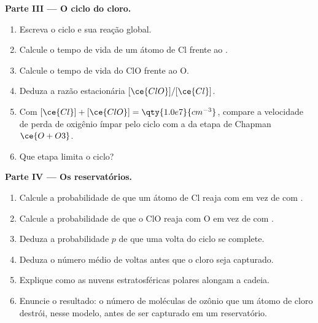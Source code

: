 \begin{problem}
\medskip\noindent\textbf{Parte III --- O ciclo do cloro.}
\begin{enumerate}[resume]
  \item Escreva o ciclo e sua reação global.
  \item Calcule o tempo de vida de um átomo de Cl frente ao .
  \item Calcule o tempo de vida do ClO frente ao O.
  \item Deduza a razão estacionária $[\ce{ClO}]/[\ce{Cl}]$.
  \item Com $[\ce{Cl}] + [\ce{ClO}] = \qty{1.0e7}{cm^{-3}}$, compare a velocidade de perda de oxigênio
        ímpar pelo ciclo com a da etapa de Chapman $\ce{O + O3}$.
  \item Que etapa limita o ciclo?
\end{enumerate}

\medskip\noindent\textbf{Parte IV --- Os reservatórios.}
\begin{enumerate}[resume]
  \item Calcule a probabilidade de que um átomo de Cl reaja com  em vez de com
        .
  \item Calcule a probabilidade de que o ClO reaja com O em vez de com .
  \item Deduza a probabilidade $p$ de que uma volta do ciclo se complete.
  \item Deduza o número médio de voltas antes que o cloro seja capturado.
  \item Explique como as nuvens estratosféricas polares alongam a cadeia.
  \item Enuncie o resultado: o número de moléculas de ozônio que um átomo de cloro
        destrói, nesse modelo, antes de ser capturado em um reservatório.
\end{enumerate}
\end{problem}
